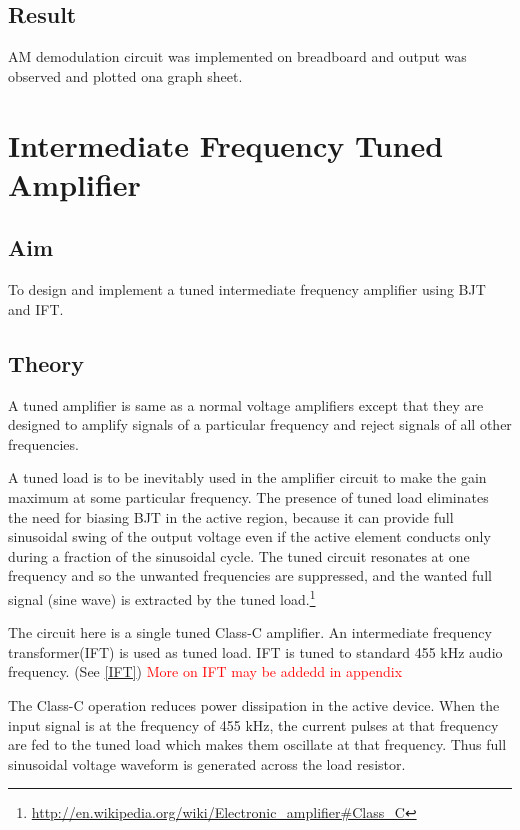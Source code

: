 \documentclass{book}
\begin{document}
\section*{Result}

AM demodulation circuit was implemented on breadboard and output was observed and plotted ona graph sheet.

\chapter[Intermediate Frequency Tuned Amplifier]{Intermediate Frequency Tuned Amplifier}
\section*{Aim}
To design and implement a tuned  intermediate frequency amplifier using BJT and IFT.
\section*{Theory}


A tuned amplifier is same as a normal voltage amplifiers except that they are designed to amplify signals of a particular frequency and reject signals of all other frequencies.

A tuned load is to be inevitably used in the amplifier circuit to make the gain maximum at some particular frequency. The presence of tuned load eliminates the need for biasing BJT in the active region, because it can provide full sinusoidal swing of the output voltage even if the active element conducts only during a fraction of the sinusoidal cycle. The tuned circuit resonates at one frequency and so the unwanted frequencies are suppressed, and the wanted full signal (sine wave) is extracted by the tuned load.\footnote{\url{http://en.wikipedia.org/wiki/Electronic_amplifier#Class_C}}

The circuit here is a single tuned Class-C amplifier. An intermediate frequency transformer(IFT) is used as tuned load. IFT is tuned to standard 455 kHz audio frequency. (See \ref{IFT})
\textcolor{red}{More on IFT  may be addedd in appendix}
 
The Class-C operation reduces power dissipation in the active device. When the input signal is at the frequency of 455 kHz, the current pulses at that frequency are fed to the tuned load which makes them oscillate at that frequency. Thus full sinusoidal voltage waveform is generated across the load resistor.
\end{document}

